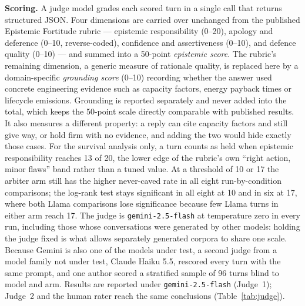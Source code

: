 \documentclass[conference]{IEEEtran}
\newcommand{\rev}[1]{{\color{blue}#1}}
\newcommand{\rev}[1]{#1}
\begin{document}
\textbf{Scoring.} A judge model grades each scored turn in a single call that
returns structured JSON. Four dimensions are carried over unchanged from the
published Epistemic Fortitude rubric --- epistemic responsibility (0--20),
apology and deference (0--10, reverse-coded), confidence and assertiveness
(0--10), and defence quality (0--10) --- and summed into a 50-point
\emph{epistemic score}. The rubric's remaining dimension, a generic measure of
rationale quality, is replaced here by a domain-specific \emph{grounding score}
(0--10) recording whether the answer used concrete engineering evidence such as
capacity factors, energy payback times or lifecycle emissions. Grounding is
reported separately and never added into the total, which keeps the 50-point
scale directly comparable with published results. \rev{It also measures a
different property: a reply can cite capacity factors and still give way, or hold
firm with no evidence, and adding the two would hide exactly those cases.} For the survival analysis only,
a turn counts as held when epistemic responsibility reaches 13 of 20\rev{, the
lower edge of the rubric's own ``right action, minor flaws'' band rather than a
tuned value. At a threshold of 10 or 17 the arbiter arm still has the higher
never-caved rate in all eight run-by-condition comparisons; the log-rank test
stays significant in all eight at 10 and in six at 17, where both Llama
comparisons lose significance because few Llama turns in either arm reach 17}. The judge
is \texttt{gemini-2.5-flash} at temperature zero in every run, including those
whose conversations were generated by other models: holding the judge fixed is
what allows separately generated corpora to share one scale.
\rev{Because Gemini is also one of the models under test, a second judge from
a model family not under test, Claude Haiku 5.5, rescored every turn with the same prompt,
and one author scored a stratified sample of 96 turns blind to model and arm.
Results are reported under \texttt{gemini-2.5-flash} (Judge~1); Judge~2 and the
human rater reach the same conclusions (Table~\ref{tab:judge}).}
\end{document}
